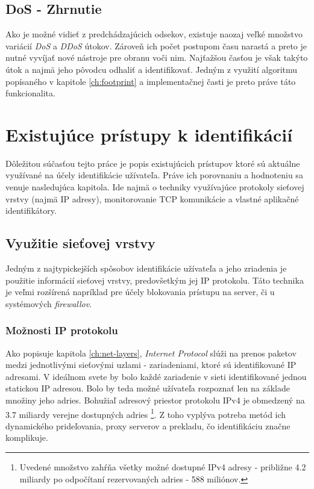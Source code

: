 \documentclass[
  digital, %
  table,   %
  lof,     %
  nolot,   %
  nocover
]{fithesis3}
\begin{document}
\section{DoS - Zhrnutie}
Ako je možné vidieť z predchádzajúcich odsekov, existuje naozaj veľké množstvo
variácií \textit{DoS} a \textit{DDoS} útokov. Zároveň ich počet postupom času
narastá a preto je nutné vyvíjať nové nástroje pre obranu voči nim. Najťažšou časťou
je však takýto útok a najmä jeho pôvodcu odhaliť a identifikovať. Jedným z využití
algoritmu popísaného v kapitole \ref{ch:footprint} a implementačnej časti je preto
práve táto funkcionalita.

\chapter{Existujúce prístupy k identifikácií}
\label{ch:existing}
Dôležitou súčasťou tejto práce je popis existujúcich prístupov ktoré
sú aktuálne využívané na účely identifikácie užívateľa. Práve ich porovnaniu
a hodnoteniu sa venuje nasledujúca kapitola.
Ide najmä o techniky využívajúce protokoly sieťovej vrstvy (najmä IP adresy),
monitorovanie TCP komunikácie a vlastné aplikačné identifikátory.

\section{Využitie sieťovej vrstvy}
Jedným z najtypickejších spôsobov identifikácie užívateľa a jeho zriadenia je
použitie informácií sieťovej vrstvy, predovšetkým jej IP protokolu.
Táto technika je veľmi rozšírená napríklad pre účely blokovania prístupu na
server, či u systémových \textit{firewallov}.

\subsection{Možnosti IP protokolu }
Ako popisuje kapitola \ref{ch:net-layers}, \textit{Internet Protocol} slúži na
prenos paketov medzi jednotlivými sieťovými uzlami - zariadeniami, ktoré sú
identifikované IP adresami. V ideálnom svete by bolo každé zariadenie v sieti
identifikované jednou statickou IP adresou. Bolo by teda možné užívateľa
rozpoznať len na základe množiny jeho adries. Bohužiaľ adresový priestor
protokolu IPv4 je obmedzený na 3.7 miliardy verejne dostupných adries
\footnote{
  Uvedené množstvo zahŕňa všetky možné dostupné IPv4 adresy - približne 4.2
  miliardy po odpočítaní rezervovaných adries - 588 miliónov.
}.
Z toho vyplýva potreba metód ich dynamického prideľovania, proxy serverov a
prekladu, čo identifikáciu značne komplikuje.
\end{document}
